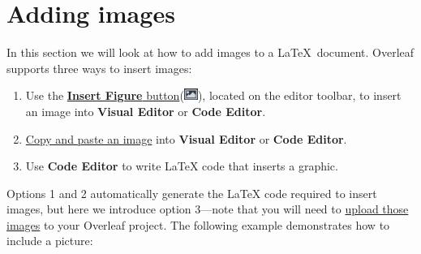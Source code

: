 \section{Adding images}

In this section we will look at how to add images to a \LaTeX\ document. Overleaf supports three ways to insert images:

\begin{enumerate}
    \item Use the \href{https://learn.overleaf.com/learn/Kb/How_to_insert_figures_in_Overleaf#Using_Insert_Figure_to_add_a_figure_to_your_project}{\textbf{Insert Figure} button}(\includegraphics[height=1em]{img8-1.png}), located on the editor toolbar, to insert an image into \textbf{Visual Editor} or \textbf{Code Editor}.
    \item \href{https://www.overleaf.com/learn/how-to/How_to_paste_formatted_content_into_Overleaf%23Pasting_images_into_your_Overleaf_project}{Copy and paste an image} into \textbf{Visual Editor} or \textbf{Code Editor}.
    \item Use \textbf{Code Editor} to write LaTeX code that inserts a graphic.
\end{enumerate}

Options 1 and 2 automatically generate the LaTeX code required to insert images, but here we introduce option 3—note that you will need to \href{https://www.overleaf.com/learn/how-to/Including_images_on_Overleaf}{upload those images} to your Overleaf project. The following example demonstrates how to include a picture:

